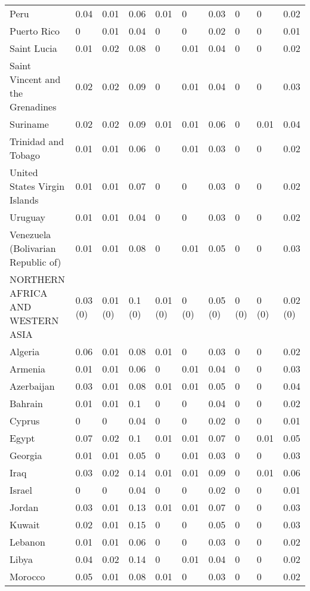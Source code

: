 \begin{longtable}[t]{llllllllll}
Peru & 0.04 & 0.01 & 0.06 & 0.01 & 0 & 0.03 & 0 & 0 & 0.02\\
Puerto Rico & 0 & 0.01 & 0.04 & 0 & 0 & 0.02 & 0 & 0 & 0.01\\
Saint Lucia & 0.01 & 0.02 & 0.08 & 0 & 0.01 & 0.04 & 0 & 0 & 0.02\\
Saint Vincent and the Grenadines & 0.02 & 0.02 & 0.09 & 0 & 0.01 & 0.04 & 0 & 0 & 0.03\\
Suriname & 0.02 & 0.02 & 0.09 & 0.01 & 0.01 & 0.06 & 0 & 0.01 & 0.04\\
Trinidad and Tobago & 0.01 & 0.01 & 0.06 & 0 & 0.01 & 0.03 & 0 & 0 & 0.02\\
United States Virgin Islands & 0.01 & 0.01 & 0.07 & 0 & 0 & 0.03 & 0 & 0 & 0.02\\
Uruguay & 0.01 & 0.01 & 0.04 & 0 & 0 & 0.03 & 0 & 0 & 0.02\\
Venezuela (Bolivarian Republic of) & 0.01 & 0.01 & 0.08 & 0 & 0.01 & 0.05 & 0 & 0 & 0.03\\
NORTHERN AFRICA AND WESTERN ASIA & 0.03 (0) & 0.01 (0) & 0.1 (0) & 0.01 (0) & 0 (0) & 0.05 (0) & 0 (0) & 0 (0) & 0.02 (0)\\
Algeria & 0.06 & 0.01 & 0.08 & 0.01 & 0 & 0.03 & 0 & 0 & 0.02\\
Armenia & 0.01 & 0.01 & 0.06 & 0 & 0.01 & 0.04 & 0 & 0 & 0.03\\
Azerbaijan & 0.03 & 0.01 & 0.08 & 0.01 & 0.01 & 0.05 & 0 & 0 & 0.04\\
Bahrain & 0.01 & 0.01 & 0.1 & 0 & 0 & 0.04 & 0 & 0 & 0.02\\
Cyprus & 0 & 0 & 0.04 & 0 & 0 & 0.02 & 0 & 0 & 0.01\\
Egypt & 0.07 & 0.02 & 0.1 & 0.01 & 0.01 & 0.07 & 0 & 0.01 & 0.05\\
Georgia & 0.01 & 0.01 & 0.05 & 0 & 0.01 & 0.03 & 0 & 0 & 0.03\\
Iraq & 0.03 & 0.02 & 0.14 & 0.01 & 0.01 & 0.09 & 0 & 0.01 & 0.06\\
Israel & 0 & 0 & 0.04 & 0 & 0 & 0.02 & 0 & 0 & 0.01\\
Jordan & 0.03 & 0.01 & 0.13 & 0.01 & 0.01 & 0.07 & 0 & 0 & 0.03\\
Kuwait & 0.02 & 0.01 & 0.15 & 0 & 0 & 0.05 & 0 & 0 & 0.03\\
Lebanon & 0.01 & 0.01 & 0.06 & 0 & 0 & 0.03 & 0 & 0 & 0.02\\
Libya & 0.04 & 0.02 & 0.14 & 0 & 0.01 & 0.04 & 0 & 0 & 0.02\\
Morocco & 0.05 & 0.01 & 0.08 & 0.01 & 0 & 0.03 & 0 & 0 & 0.02\\

\end{longtable}
